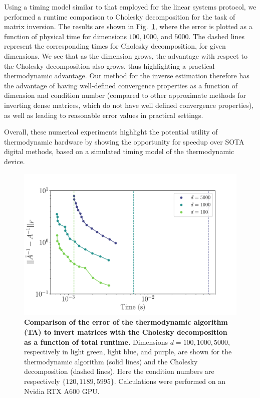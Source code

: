 \documentclass[prx,onecolumn,floatfix,longbibliography,notitlepage, nofootinbib,12pt]{revtex4-2}
\begin{document}
Using a timing model similar to that employed for the linear systems protocol, we performed a runtime comparison to Cholesky decomposition for the task of matrix inversion. The results are shown in Fig.~\ref{fig:inverse_estim_comparison_d}, where the error is plotted as a function of physical time for dimensions $100, 1000$, and $5000$. The dashed lines represent the corresponding times for Cholesky decomposition, for given dimensions. We see that as the dimension grows, the advantage with respect to the Cholesky decomposition also grows, thus highlighting a practical thermodynamic advantage. Our method for the inverse estimation therefore has the advantage of having well-defined convergence properties as a function of dimension and condition number (compared to other approximate methods for inverting dense matrices, which do not have well defined convergence properties), as well as leading to reasonable error values in practical settings.

Overall, these numerical experiments highlight the potential utility of thermodynamic hardware by showing the opportunity for speedup over SOTA digital methods, based on a simulated timing model of the thermodynamic device. 


\begin{figure}[t]
   \centering
\includegraphics[width=0.6\linewidth]{figures/error_vs_time_inverse.pdf}
   \caption{\textbf{Comparison of the error of the thermodynamic algorithm (TA) to invert matrices with the Cholesky decomposition as a function of total runtime.} Dimensions $d = 100, 1000, 5000$, respectively in light green, light blue, and purple, are shown for the thermodynamic algorithm (solid lines) and the Cholesky decomposition (dashed lines). Here the condition numbers are respectively $\{120, 1189, 5995\}$. Calculations were performed on an Nvidia RTX A600 GPU.}
\label{fig:inverse_estim_comparison_d}
\end{figure}
\end{document}
